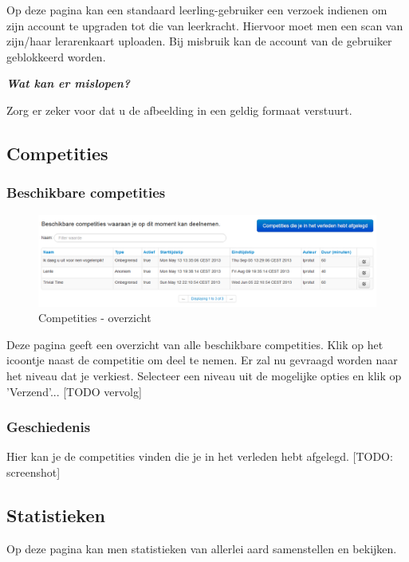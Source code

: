 \documentclass[]{article}
\begin{document}
Op deze pagina kan een standaard leerling-gebruiker een verzoek indienen om zijn account te upgraden tot die van leerkracht. Hiervoor moet men een scan van zijn/haar lerarenkaart uploaden. Bij misbruik kan de account van de gebruiker geblokkeerd worden.

\textbf{\textit{Wat kan er mislopen?}}

Zorg er zeker voor dat u de afbeelding in een geldig formaat verstuurt.

\subsection{Competities}

\subsubsection{Beschikbare competities}

\begin{figure}[!ht]
	\centering
	\includegraphics[width=1\textwidth]{img/comp}
	\caption{Competities - overzicht}
	\label{comp}
\end{figure}

Deze pagina geeft een overzicht van alle beschikbare competities. Klik op het icoontje naast de competitie om deel te nemen. Er zal nu gevraagd worden naar het niveau dat je verkiest. Selecteer een niveau uit de mogelijke opties en klik op 'Verzend'... [TODO vervolg]

\subsubsection{Geschiedenis}

Hier kan je de competities vinden die je in het verleden hebt afgelegd. [TODO: screenshot]

\subsection{Statistieken}

Op deze pagina kan men statistieken van allerlei aard samenstellen en bekijken. 
\end{document}
